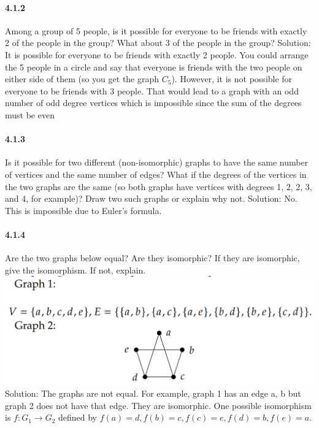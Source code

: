 \documentclass{article}
\begin{document}
\paragraph{4.1.2}
Among a group of 5 people, is it possible for everyone to be friends with exactly 2 of the people in the group? What about 3 of the people in the group?\newline
Solution:\newline
It is possible for everyone to be friends with exactly 2 people. You
could arrange the 5 people in a circle and say that everyone is friends with
the two people on either side of them (so you get the graph $C_5$). However,
it is not possible for everyone to be friends with 3 people. That would lead
to a graph with an odd number of odd degree vertices which is impossible
since the sum of the degrees must be even
\paragraph{4.1.3}
Is it possible for two different (non-isomorphic) graphs to have the same number of vertices and the same number of edges? What if the degrees of the vertices in the two graphs are the same (so both graphs have vertices with degrees 1, 2, 2, 3, and 4, for example)? Draw two such graphs or explain why not.\newline
Solution:\newline
No. This is impossible due to Euler’s formula.
\paragraph{4.1.4}
Are the two graphs below equal? Are they isomorphic? If they are isomorphic, give the isomorphism. If not, explain.\newline
\includegraphics{0040}\newline
Solution:\newline
The graphs are not equal. For example, graph 1 has an edge {a, b}
but graph 2 does not have that edge. They are isomorphic. One possible
isomorphism is $f: G_1 \to G_2$ defined by $f(a)=d, f(b)=c, f(c)=e, f(d)=b, f(e)=a.$
\end{document}
